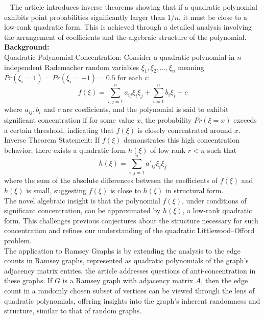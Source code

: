 

~\cite{kwan2019algebraic}
The article introduces inverse theorems showing that if a quadratic polynomial exhibits point probabilities significantly larger than ${1/n}$, it must be close to a low-rank quadratic form. This is achieved through a detailed analysis involving the arrangement of coefficients and the algebraic structure of the polynomial.\\\newline
\textbf{Background:}\\
Quadratic Polynomial Concentration: Consider a quadratic polynomial in ${n}$ independent Rademacher random variables ${\xi_1, \xi_2,...,\xi_n}$ meaning ${Pr(\xi_i=1)=Pr(\xi_i=-1)=0.5}$ for each ${i}$:
$${f(\xi)=\sum_{i,j=1}^{n} a_{ij} \xi_i \xi_j + \sum_{i=1}^{n} b_i \xi_i + c}$$
where ${a_{ij},b_i}$ and ${c}$ are coefficients, and the polynomial is said to exhibit significant concentration if for some value ${x}$, the probability ${Pr(\xi=x)}$ exceeds a certain threshold, indicating that ${f(\xi)}$ is closely concentrated around ${x}$.\\\newline
Inverse Theorem Statement: If ${f(\xi)}$ demonstrates this high concentration behavior, there exists a quadratic form ${h(\xi)}$ of low rank ${r < n}$ such that
$${h(\xi) = \sum_{i,j=1}^{n} a'_{ij} \xi_i \xi_j
}$$
where the sum of the absolute differences between the coefficients of ${f(\xi)}$ and ${h(\xi)}$ is small, suggesting ${f(\xi)}$ is close to ${h(\xi)}$ in structural form.
\\\newline
The novel algebraic insight is that the polynomial ${f(\xi)}$, under conditions of significant concentration, can be approximated by ${h(\xi)}$, a low-rank quadratic form. This challenges previous conjectures about the structure necessary for such concentration and refines our understanding of the quadratic Littlewood–Offord problem.\\\newline
The application to Ramsey Graphs is by extending the analysis to the edge counts in Ramsey graphs, represented as quadratic polynomials of the graph's adjacency matrix entries, the article addresses questions of anti-concentration in these graphs. If ${G}$ is a Ramsey graph with adjacency matrix 
${A}$, then the edge count in a randomly chosen subset of vertices can be viewed through the lens of quadratic polynomials, offering insights into the graph's inherent randomness and structure, similar to that of random graphs.\\\newline
